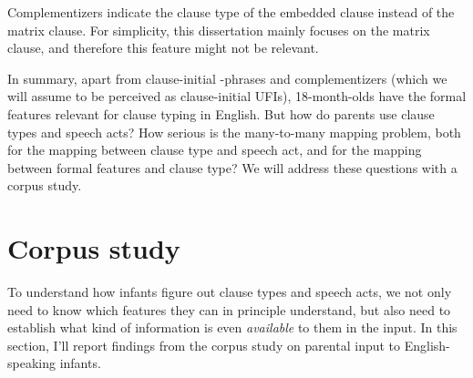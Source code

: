 Complementizers indicate the clause type of the embedded clause instead of the matrix clause. For simplicity, this dissertation mainly focuses on the matrix clause, and therefore this feature might not be relevant.  %





In summary, apart from clause-initial \twh-phrases and complementizers (which we will assume to be perceived as clause-initial UFIs), 18-month-olds have the formal features relevant for clause typing in English. But how do parents use clause types and speech acts? How serious is the many-to-many mapping problem, both for the mapping between clause type and speech act, and for the mapping between formal features and clause type? We will address these questions with a corpus study. %

\section{Corpus study}
\label{sec:engcl:corpus}
To understand how infants figure out clause types and speech acts, we not only need to know which features they can in principle understand, but also need to establish what kind of information is even \emph{available} to them in the input. In this section, I’ll report findings from the corpus study on parental input to English-speaking infants. 


